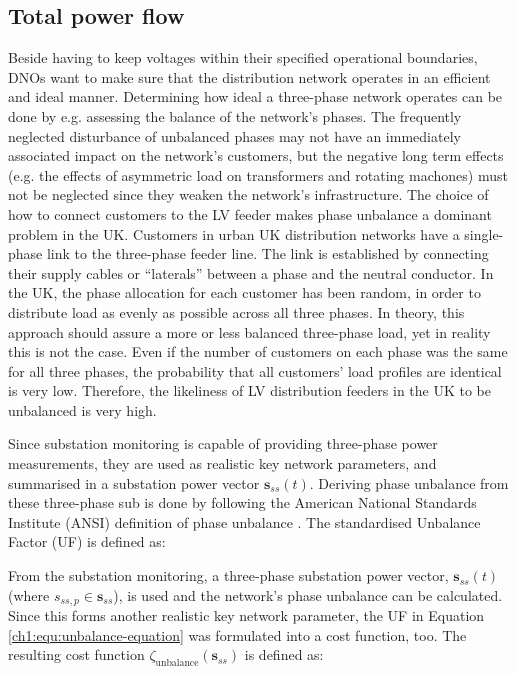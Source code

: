 

\subsection{Total power flow}
\label{ch1:subsec:total-power-flow}

Beside having to keep voltages within their specified operational boundaries, DNOs want to make sure that the distribution network operates in an efficient and ideal manner.
Determining how ideal a three-phase network operates can be done by e.g. assessing the balance of the network's phases.
The frequently neglected disturbance of unbalanced phases may not have an immediately associated impact on the network's customers, but the negative long term effects (e.g. the effects of asymmetric load on transformers and rotating machones) must not be neglected since they weaken the network's infrastructure.
The choice of how to connect customers to the LV feeder makes phase unbalance a dominant problem in the UK.
Customers in urban UK distribution networks have a single-phase link to the three-phase feeder line.
The link is established by connecting their supply cables or ``laterals'' between a phase and the neutral conductor.
In the UK, the phase allocation for each customer has been random, in order to distribute load as evenly as possible across all three phases.
In theory, this approach should assure a more or less balanced three-phase load, yet in reality this is not the case.
Even if the number of customers on each phase was the same for all three phases, the probability that all customers' load profiles are identical is very low.
Therefore, the likeliness of LV distribution feeders in the UK to be unbalanced is very high.

Since substation monitoring is capable of providing three-phase power measurements, they are used as realistic key network parameters, and summarised in a substation power vector $\textbf{s}_{ss}(t)$.
Deriving phase unbalance from these three-phase sub is done by following the American National Standards Institute (ANSI) definition of phase unbalance \cite{ANSI-MB-1-2011}.
The standardised Unbalance Factor (UF) is defined as:



From the substation monitoring, a three-phase substation power vector, $\textbf{s}_{ss}(t)$ (where $s_{ss,p} \in \textbf{s}_{ss}$), is used and the network's phase unbalance can be calculated.
Since this forms another realistic key network parameter, the UF in Equation \ref{ch1:equ:unbalance-equation} was formulated into a cost function, too.
The resulting cost function $\zeta_\text{unbalance}(\textbf{s}_{ss})$ is defined as:

